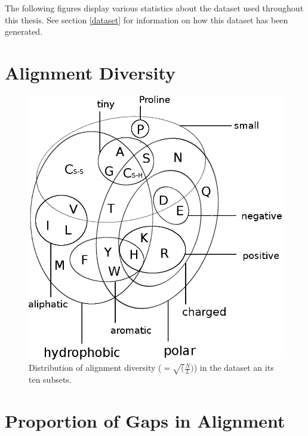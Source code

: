 \documentclass[12pt,a4paper,twoside]{book}
\theoremstyle{definition}
\theoremstyle{definition}
\theoremstyle{remark}
\begin{document}
The following figures display various statistics about the dataset used
throughout this thesis. See section \ref{dataset} for information on how
this dataset has been generated.

\section{Alignment Diversity}\label{alignment-diversity}




\begin{figure}
\includegraphics[width=1\linewidth]{img/amino_acid_physico_chemical_properties_venn_diagramm} \caption{Distribution of alignment diversity
(\(=\sqrt(\frac{N}{L})\)) in the dataset an its ten subsets.}\label{fig:dataset-diversity}
\end{figure}

\section{Proportion of Gaps in
Alignment}\label{proportion-of-gaps-in-alignment}
\end{document}
